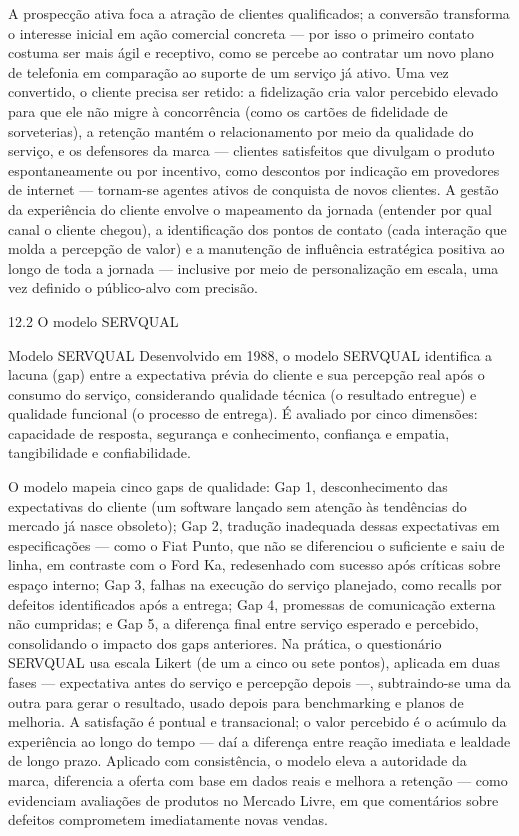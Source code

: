 A prospecção ativa foca a atração de clientes qualificados; a conversão transforma o interesse inicial em ação comercial concreta — por isso o primeiro contato costuma ser mais ágil e receptivo, como se percebe ao contratar um novo plano de telefonia em comparação ao suporte de um serviço já ativo. Uma vez convertido, o cliente precisa ser retido: a fidelização cria valor percebido elevado para que ele não migre à concorrência (como os cartões de fidelidade de sorveterias), a retenção mantém o relacionamento por meio da qualidade do serviço, e os defensores da marca — clientes satisfeitos que divulgam o produto espontaneamente ou por incentivo, como descontos por indicação em provedores de internet — tornam-se agentes ativos de conquista de novos clientes. A gestão da experiência do cliente envolve o mapeamento da jornada (entender por qual canal o cliente chegou), a identificação dos pontos de contato (cada interação que molda a percepção de valor) e a manutenção de influência estratégica positiva ao longo de toda a jornada — inclusive por meio de personalização em escala, uma vez definido o público-alvo com precisão.

12.2 O modelo SERVQUAL

Modelo SERVQUAL Desenvolvido em 1988, o modelo SERVQUAL identifica a lacuna (gap) entre a expectativa prévia do cliente e sua percepção real após o consumo do serviço, considerando qualidade técnica (o resultado entregue) e qualidade funcional (o processo de entrega). É avaliado por cinco dimensões: capacidade de resposta, segurança e conhecimento, confiança e empatia, tangibilidade e confiabilidade.

O modelo mapeia cinco gaps de qualidade: Gap 1, desconhecimento das expectativas do cliente (um software lançado sem atenção às tendências do mercado já nasce obsoleto); Gap 2, tradução inadequada dessas expectativas em especificações — como o Fiat Punto, que não se diferenciou o suficiente e saiu de linha, em contraste com o Ford Ka, redesenhado com sucesso após críticas sobre espaço interno; Gap 3, falhas na execução do serviço planejado, como recalls por defeitos identificados após a entrega; Gap 4, promessas de comunicação externa não cumpridas; e Gap 5, a diferença final entre serviço esperado e percebido, consolidando o impacto dos gaps anteriores. Na prática, o questionário SERVQUAL usa escala Likert (de um a cinco ou sete pontos), aplicada em duas fases — expectativa antes do serviço e percepção depois —, subtraindo-se uma da outra para gerar o resultado, usado depois para benchmarking e planos de melhoria. A satisfação é pontual e transacional; o valor percebido é o acúmulo da experiência ao longo do tempo — daí a diferença entre reação imediata e lealdade de longo prazo. Aplicado com consistência, o modelo eleva a autoridade da marca, diferencia a oferta com base em dados reais e melhora a retenção — como evidenciam avaliações de produtos no Mercado Livre, em que comentários sobre defeitos comprometem imediatamente novas vendas.

